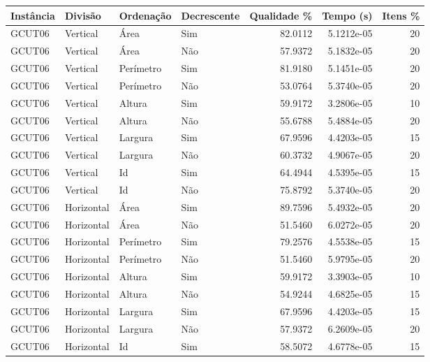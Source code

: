 \begin{tabular}{llllrrr}
\hline
Instância & Divisão     & Ordenação & Decrescente & Qualidade \% & Tempo (s)  & Itens \% \\
\hline
GCUT06    & Vertical    & Área      & Sim         & 82.0112      & 5.1212e-05 & 20       \\
GCUT06    & Vertical    & Área      & Não         & 57.9372      & 5.1832e-05 & 20       \\
GCUT06    & Vertical    & Perímetro & Sim         & 81.9180      & 5.1451e-05 & 20       \\
GCUT06    & Vertical    & Perímetro & Não         & 53.0764      & 5.3740e-05 & 20       \\
GCUT06    & Vertical    & Altura    & Sim         & 59.9172      & 3.2806e-05 & 10       \\
GCUT06    & Vertical    & Altura    & Não         & 55.6788      & 5.4884e-05 & 20       \\
GCUT06    & Vertical    & Largura   & Sim         & 67.9596      & 4.4203e-05 & 15       \\
GCUT06    & Vertical    & Largura   & Não         & 60.3732      & 4.9067e-05 & 20       \\
GCUT06    & Vertical    & Id        & Sim         & 64.4944      & 4.5395e-05 & 15       \\
GCUT06    & Vertical    & Id        & Não         & 75.8792      & 5.3740e-05 & 20       \\
GCUT06    & Horizontal  & Área      & Sim         & 89.7596      & 5.4932e-05 & 20       \\
GCUT06    & Horizontal  & Área      & Não         & 51.5460      & 6.0272e-05 & 20       \\
GCUT06    & Horizontal  & Perímetro & Sim         & 79.2576      & 4.5538e-05 & 15       \\
GCUT06    & Horizontal  & Perímetro & Não         & 51.5460      & 5.9795e-05 & 20       \\
GCUT06    & Horizontal  & Altura    & Sim         & 59.9172      & 3.3903e-05 & 10       \\
GCUT06    & Horizontal  & Altura    & Não         & 54.9244      & 4.6825e-05 & 15       \\
GCUT06    & Horizontal  & Largura   & Sim         & 67.9596      & 4.4203e-05 & 15       \\
GCUT06    & Horizontal  & Largura   & Não         & 57.9372      & 6.2609e-05 & 20       \\
GCUT06    & Horizontal  & Id        & Sim         & 58.5072      & 4.6778e-05 & 15       \\

\end{tabular}
